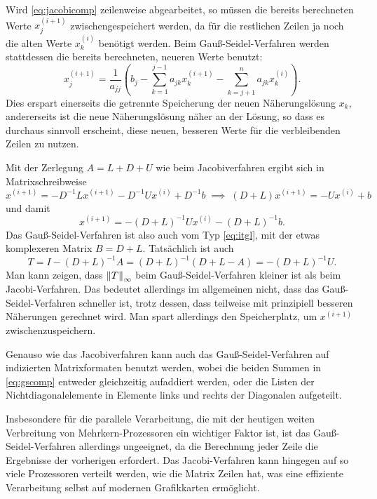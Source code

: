 Wird \eqref{eq:jacobicomp} zeilenweise abgearbeitet, so müssen die
bereits berechneten Werte $x_j^{(i+1)}$ zwischengespeichert werden,
da für die restlichen Zeilen ja noch die alten Werte $x_k^{(i)}$
benötigt werden. Beim Gauß-Seidel-Verfahren werden stattdessen die
bereits berechneten, neueren Werte benutzt:
\begin{equation}
  \label{eq:gscomp}
  x_j^{(i+1)} = \frac{1}{a_{jj}}\left(b_j -
    \sum_{k=1}^{j-1} a_{jk}x_k^{(i+1)} - \sum_{k=j+1}^n a_{jk}x_k^{(i)}\right).
\end{equation}
Dies erspart einerseits die getrennte Speicherung der neuen
Näherungslösung $x_k$, andererseits ist die neue Näherungslösung näher
an der Lösung, so dass es durchaus sinnvoll erscheint, diese neuen, besseren
Werte für die verbleibenden Zeilen zu nutzen.

Mit der Zerlegung $A=L + D + U$ wie beim Jacobiverfahren ergibt sich
in Matrixschreibweise
\begin{equation}
  x^{(i+1)} = -D^{-1}L x^{(i+1)} - D^{-1} U x^{(i)} + D^{-1}b
  \;\implies\;
  (D + L)x^{(i+1)} = - U x^{(i)} + b
\end{equation}
und damit
\begin{equation}
  x^{(i+1)} = -(D+L)^{-1} U x^{(i)} - (D+L)^{-1}b.
\end{equation}
Das Gauß-Seidel-Verfahren ist also auch vom Typ \eqref{eq:itgl}, mit
der etwas komplexeren Matrix $B= D + L$. Tatsächlich ist auch
\begin{equation}
  \label{eq:gst}
  T = I - (D + L)^{-1} A = (D + L)^{-1}(D + L - A) = -(D+L)^{-1} U.
\end{equation}
Man kann zeigen, dass $\left\lVert{T}\right\rVert_\infty$ beim Gauß-Seidel-Verfahren
kleiner ist als beim Jacobi-Verfahren. Das bedeutet allerdings im
allgemeinen nicht, dass das Gauß-Seidel-Verfahren schneller ist, trotz
dessen, dass teilweise mit prinzipiell besseren Näherungen gerechnet
wird. Man spart allerdings den Speicherplatz, um $x^{(i+1)}$
zwischenzuspeichern.

Genauso wie das Jacobiverfahren kann auch das Gauß-Seidel-Verfahren
auf indizierten Matrixformaten benutzt werden, wobei die beiden Summen
in \eqref{eq:gscomp} entweder gleichzeitig aufaddiert werden, oder die
Listen der Nichtdiagonalelemente in Elemente links und rechts der
Diagonalen aufgeteilt.

Insbesondere für die parallele Verarbeitung, die mit der heutigen
weiten Verbreitung von Mehrkern-Prozessoren ein wichtiger Faktor ist,
ist das Gauß-Seidel-Verfahren allerdings ungeeignet, da die Berechnung
jeder Zeile die Ergebnisse der vorherigen erfordert. Das
Jacobi-Verfahren kann hingegen auf so viele Prozessoren verteilt
werden, wie die Matrix Zeilen hat, was eine effiziente Verarbeitung
selbst auf modernen Grafikkarten ermöglicht.

